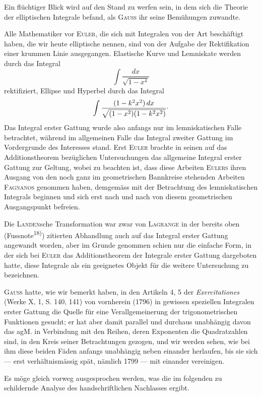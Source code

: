 Ein flüchtiger Blick wird auf den Stand zu werfen sein, in dem sich die
Theorie der elliptischen Integrale befand, als \textsc{Gauss} ihr seine Bemühungen
zuwandte.

Alle Mathematiker vor \textsc{Euler}, die sich mit Integralen von der Art beschäftigt
haben, die wir heute elliptische nennen, sind von der Aufgabe der
Rektifikation einer krummen Linie ausgegangen. Elastische Kurve und Lemniskate
werden durch das Integral
\clearpage{}
\[
\int\frac{dx}{\sqrt{1-x^4}}
\]
rektifiziert, Ellipse und Hyperbel durch das Integral
\[
\int\frac{(1-k^2x^2)\,dx}{\sqrt{(1-x^2)(1-k^2x^2)}}\mathpunct{\vcenter{\hbox{.}}}
\]
Das Integral erster Gattung wurde also anfangs nur im lemniskatischen Falle
betrachtet, während im allgemeinen Falle das Integral zweiter Gattung im
Vordergrunde des Interesses stand. Erst \textsc{Euler} brachte in seinen auf das
Additionstheorem bezüglichen Untersuchungen das allgemeine Integral erster
Gattung zur Geltung, wobei zu beachten ist, dass diese Arbeiten \textsc{Eulers}
ihren Ausgang von den noch ganz im geometrischen Bannkreise stehenden
Arbeiten \textsc{Fagnanos} genommen haben, demgemäss mit der Betrachtung des
lemniskatischen Integrals beginnen und sich erst nach und nach von diesem
geometrischen Ausgangspunkt befreien.

Die \textsc{Landen}sche Transformation war zwar von \textsc{Lagrange} in der bereits oben
(Fussnote\textsuperscript{18)}) zitierten Abhandlung auch auf das Integral erster Gattung angewandt
worden, aber im Grunde genommen schien nur die einfache Form, in der
sich bei \textsc{Euler} das Additionstheorem der Integrale erster Gattung dargeboten
hatte, diese Integrale als ein geeignetes Objekt für die weitere Untersuchung
zu bezeichnen.

\textsc{Gauss} hatte, wie wir bemerkt haben, in den Artikeln 4, 5 der \textit{Exercitationes}
(Werke X, 1, S. 140, 141) von vornherein (1796) in gewissen speziellen Integralen
erster Gattung die Quelle für eine Verallgemeinerung der trigonometrischen
Funktionen gesucht; er hat aber damit parallel und durchaus unabhängig
davon das agM. in Verbindung mit den Reihen, deren Exponenten
die Quadratzahlen sind, in den Kreis seiner Betrachtungen gezogen, und wir
werden sehen, wie bei ihm diese beiden Fäden anfangs unabhängig neben
einander herlaufen, bis sie sich — erst verhältnismässig spät, nämlich 1799 —
mit einander vereinigen.

Es möge gleich vorweg ausgesprochen werden, was die im folgenden zu
schildernde Analyse des handschriftlichen Nachlasses ergibt.

